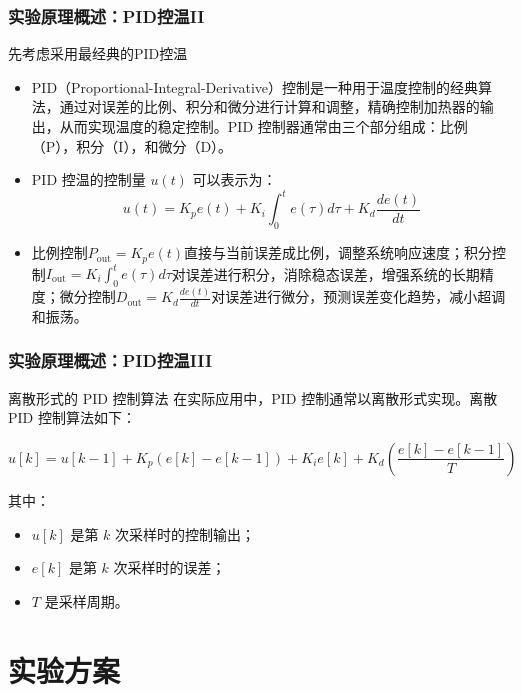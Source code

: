 \documentclass[aspectratio=169]{beamer}
\begin{document}
	\begin{frame}
		\frametitle{实验原理概述：PID控温II}
		
		\begin{block}{先考虑采用最经典的PID控温}
			\begin{itemize}
				\small\item PID（Proportional-Integral-Derivative）控制是一种用于温度控制的经典算法，通过对误差的比例、积分和微分进行计算和调整，精确控制加热器的输出，从而实现温度的稳定控制。PID 控制器通常由三个部分组成：比例（P），积分（I），和微分（D）。
				
				\small\item PID 控温的控制量 $u(t)$ 可以表示为：$$u(t) = K_p e(t) + K_i \int_0^t e(\tau) d\tau + K_d \frac{d e(t)}{dt}$$
				
				\item \small 比例控制$P_{\text{out}} = K_p e(t)$直接与当前误差成比例，调整系统响应速度；积分控制$I_{\text{out}} = K_i \int_0^t e(\tau) d\tau$对误差进行积分，消除稳态误差，增强系统的长期精度；微分控制$D_{\text{out}} = K_d \frac{d e(t)}{dt}$对误差进行微分，预测误差变化趋势，减小超调和振荡。
			\end{itemize}			
		\end{block}
		
	\end{frame}
	
	\begin{frame}
		\frametitle{实验原理概述：PID控温III}
		
		\begin{block}{离散形式的 PID 控制算法}
			在实际应用中，PID 控制通常以\textcolor{c4}{离散形式}实现。离散 PID 控制算法如下：			
			\begin{myhighlight}
				\small\[
				u[k] = u[k-1] + K_p (e[k] - e[k-1]) + K_i e[k] + K_d \left( \frac{e[k] - e[k-1]}{T} \right)
				\]
			\end{myhighlight}
			其中：
			\begin{itemize}
				\item $u[k]$ 是第 $k$ 次采样时的控制输出；
				\item $e[k]$ 是第 $k$ 次采样时的误差；
				\item $T$ 是采样周期。
			\end{itemize}
		\end{block}
		
	\end{frame}
	
	
	
	\section{实验方案}
	
\end{document}
